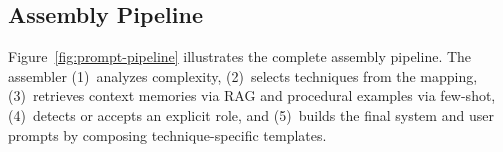 \documentclass[runningheads]{llncs}
\begin{document}
\begin{table}[t]
\centering
\caption{Complexity-to-technique mapping. Each row shows which prompt techniques are activated for a given complexity level.}\label{tab:techniques}
\end{table}

\subsection{Assembly Pipeline}

Figure~\ref{fig:prompt-pipeline} illustrates the complete assembly pipeline. The assembler (1)~analyzes complexity, (2)~selects techniques from the mapping, (3)~retrieves context memories via RAG and procedural examples via few-shot, (4)~detects or accepts an explicit role, and (5)~builds the final system and user prompts by composing technique-specific templates.
\end{document}
